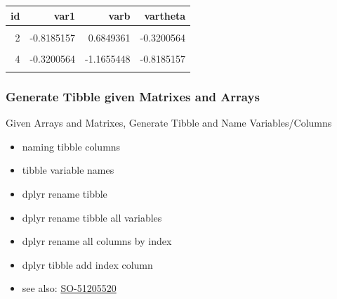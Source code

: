 \documentclass[
]{book}
\providecommand{\tightlist}{%
  \setlength{\itemsep}{0pt}\setlength{\parskip}{0pt}}
\begin{document}
\begin{table}[!h]
\centering
\begin{tabular}{r|r|r|r}
\hline
id & var1 & varb & vartheta\\
\hline
\cellcolor{gray!6}{1} & \cellcolor{gray!6}{-1.1655448} & \cellcolor{gray!6}{-0.8185157} & \cellcolor{gray!6}{0.6849361}\\
\hline
2 & -0.8185157 & 0.6849361 & -0.3200564\\
\hline
\cellcolor{gray!6}{3} & \cellcolor{gray!6}{0.6849361} & \cellcolor{gray!6}{-0.3200564} & \cellcolor{gray!6}{-1.1655448}\\
\hline
4 & -0.3200564 & -1.1655448 & -0.8185157\\
\hline
\cellcolor{gray!6}{5} & \cellcolor{gray!6}{-1.1655448} & \cellcolor{gray!6}{-0.8185157} & \cellcolor{gray!6}{0.6849361}\\
\hline
\end{tabular}
\end{table}

\hypertarget{generate-tibble-given-matrixes-and-arrays}{%
\subsubsection{Generate Tibble given Matrixes and Arrays}\label{generate-tibble-given-matrixes-and-arrays}}

Given Arrays and Matrixes, Generate Tibble and Name Variables/Columns

\begin{itemize}
\tightlist
\item
  naming tibble columns
\item
  tibble variable names
\item
  dplyr rename tibble
\item
  dplyr rename tibble all variables
\item
  dplyr rename all columns by index
\item
  dplyr tibble add index column
\item
  see also: \href{https://stackoverflow.com/questions/45535157/difference-between-dplyrrename-and-dplyrrename-all}{SO-51205520}
\end{itemize}
\end{document}
